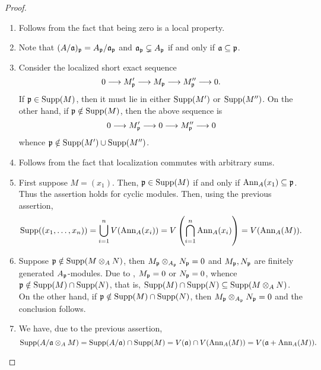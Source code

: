 \begin{proof}
\begin{enumerate}[label=(\alph*)]
    \item Follows from the fact that being zero is a local property. 
    \item Note that $(A/\mathfrak a)_\mathfrak p = A_\mathfrak p/\mathfrak a_\mathfrak p$ and $\mathfrak a_\mathfrak p\subsetneq A_\mathfrak p$ if and only if $\mathfrak a\subseteq\mathfrak p$.
    \item Consider the localized short exact sequence 
    \begin{equation*}
        0\longrightarrow M'_\mathfrak p\longrightarrow M_\mathfrak p\longrightarrow M''_\mathfrak p\longrightarrow 0.
    \end{equation*}
    If $\mathfrak p\in\operatorname{Supp}(M)$, then it must lie in either $\operatorname{Supp}(M')$ or $\operatorname{Supp}(M'')$. On the other hand, if $\mathfrak p\notin\operatorname{Supp}(M)$, then the above sequence is 
    \begin{equation*}
        0\longrightarrow M'_\mathfrak p\longrightarrow 0\longrightarrow M''_\mathfrak p\longrightarrow 0
    \end{equation*}
    whence $\mathfrak p\notin\operatorname{Supp}(M')\cup\operatorname{Supp}(M'')$. 
    \item Follows from the fact that localization commutes with arbitrary sums.
    \item First suppose $M = (x_1)$. Then, $\mathfrak p\in\operatorname{Supp}(M)$ if and only if $\operatorname{Ann}_A(x_1)\subseteq\mathfrak p$. Thus the assertion holds for cyclic modules. Then, using the previous assertion,
    \begin{equation*}
        \operatorname{Supp}((x_1,\dots,x_n)) = \bigcup_{i = 1}^n V(\operatorname{Ann}_A(x_i)) = V\left(\bigcap_{i = 1}^n\operatorname{Ann}_A(x_i)\right) = V(\operatorname{Ann}_A(M)).
    \end{equation*}
    \item Suppose $\mathfrak p\notin\operatorname{Supp}(M\otimes_A N)$, then $M_\mathfrak p\otimes_{A_\mathfrak p}N_\mathfrak p = 0$ and $M_\mathfrak p, N_\mathfrak p$ are finitely generated $A_\mathfrak p$-modules. Due to , $M_\mathfrak p = 0$ or $N_\mathfrak p = 0$, whence $\mathfrak p\notin\operatorname{Supp}(M)\cap\operatorname{Supp}(N)$, that is, $\operatorname{Supp}(M)\cap\operatorname{Supp}(N)\subseteq\operatorname{Supp}(M\otimes_A N)$. On the other hand, if $\mathfrak p\notin\operatorname{Supp}(M)\cap\operatorname{Supp}(N)$, then $M_\mathfrak p\otimes_{A_\mathfrak p} N_\mathfrak p = 0$ and the conclusion follows.

    \item We have, due to the previous assertion, 
    \begin{equation*}
        \operatorname{Supp}(A/\mathfrak a\otimes_A M) = \operatorname{Supp}(A/\mathfrak a)\cap\operatorname{Supp}(M) = V(\mathfrak a)\cap V(\operatorname{Ann}_A(M)) = V(\mathfrak a + \operatorname{Ann}_A(M)).\qedhere
    \end{equation*}
\end{enumerate}
\end{proof}